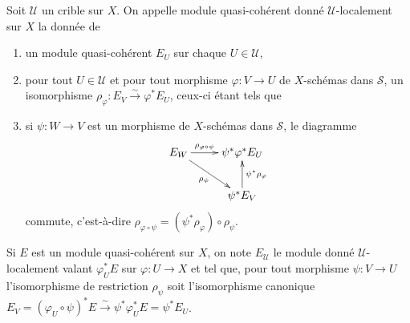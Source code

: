 \documentclass{article}
\newcommand{\cS}{\mathcal{S}}
\newcommand{\cU}{\mathcal{U}}
\newcommand{\iso}{\xrightarrow\sim}
\begin{document}
\subsubsection{}\label{1-4-4}

Soit $\cU$ un crible sur $X$. On appelle module quasi-cohérent donné 
$\cU$-localement sur $X$ la donnée de 
\begin{enumerate}[\indent a)]
  \item un module quasi-cohérent $E_U$ sur chaque $U\in\cU$, 
  \item pour tout $U\in\cU$ et pour tout morphisme $\varphi:V\to U$ de 
    $X$-schémas dans $\cS$, un isomorphisme 
    $\rho_\varphi:E_V\iso \varphi^* E_U$, ceux-ci étant tels que 
  \item si $\psi:W\to V$ est un morphisme de $X$-schémas dans $\cS$, le 
    diagramme 
    \[\xymatrix{
      E_W \ar[r]^-{\rho_{\varphi\circ\psi}} \ar[dr]_-{\rho_\psi} 
        & \psi^*\varphi^* E_U \\
      & \psi^* E_V \ar[u]_-{\psi^*\rho_\varphi}
    }\]
    commute, c'est-à-dire 
    $\rho_{\varphi\circ\psi}=(\psi^*\rho_\varphi)\circ \rho_\psi$. 
\end{enumerate}

Si $E$ est un module quasi-cohérent sur $X$, on note $E_\cU$ le module 
donné $\cU$-localement valant $\varphi_U^* E$ sur $\varphi:U\to X$ et tel que, 
pour tout morphisme $\psi:V\to U$ l'isomorphisme de restriction $\rho_\psi$ 
soit l'isomorphisme canonique 
$E_V=(\varphi_U\circ \psi)^* E\iso \psi^* \varphi_U^* E = \psi^* E_U$. 
\end{document}
